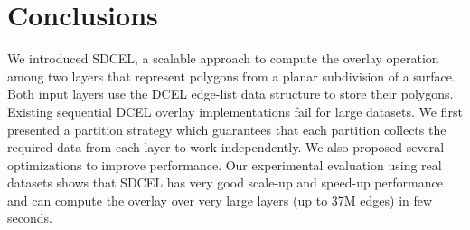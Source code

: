 \chapter{Conclusions}
We introduced SDCEL, a scalable approach to compute the overlay operation among two layers that represent polygons from a planar subdivision of a surface. Both 
input layers use the DCEL edge-list data structure to store their polygons. Existing sequential DCEL overlay implementations fail for large datasets. We first 
presented a partition strategy which guarantees that each partition collects the required data from each layer to work independently. 
We also proposed several optimizations to improve performance. Our experimental evaluation using real datasets shows that SDCEL has very good scale-up and 
speed-up performance and can compute the overlay over very large layers (up to 37M edges) in few seconds.
